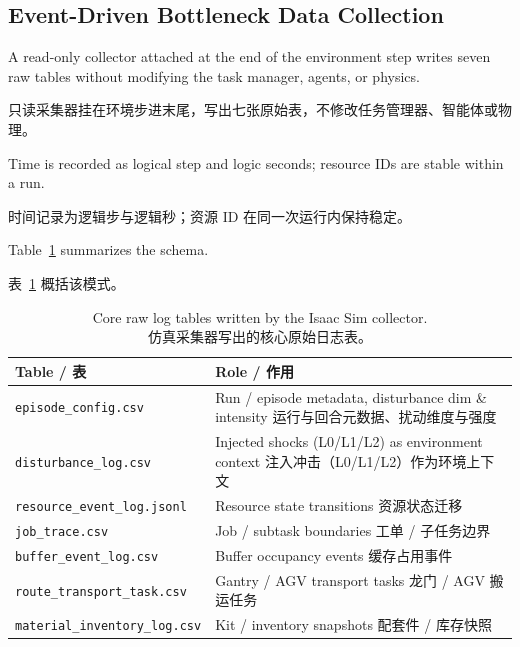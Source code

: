 \documentclass[12pt,a4paper,oneside,scheme=plain]{ctexrep}
\newcommand{\bip}[2]{%
  \par #1\par
  \nobreak\vspace{0.12em}%
  {\small\color{black!62}#2}\par
  \vspace{0.62em}%
}
\begin{document}
\subsection[Event-Driven Bottleneck Data Collection / 事件驱动数据采集]{Event-Driven Bottleneck Data Collection}
\label{sec:collect}

\bip
{A read-only collector attached at the end of the environment step writes seven raw tables without modifying the task manager, agents, or physics.}
{只读采集器挂在环境步进末尾，写出七张原始表，不修改任务管理器、智能体或物理。}

\bip
{Time is recorded as logical step and logic seconds; resource IDs are stable within a run.}
{时间记录为逻辑步与逻辑秒；资源 ID 在同一次运行内保持稳定。}

\bip
{Table~\ref{tab:raw} summarizes the schema.}
{表~\ref{tab:raw} 概括该模式。}

\begin{table}[ht]
\centering
\caption{Core raw log tables written by the Isaac Sim collector.\\
{\small 仿真采集器写出的核心原始日志表。}}
\label{tab:raw}
\begin{tabular}{p{}p{}}
\toprule
Table / 表 & Role / 作用 \\
\midrule
\texttt{episode\_config.csv} &
Run / episode metadata, disturbance dim \& intensity\newline
{\small 运行与回合元数据、扰动维度与强度} \\
\texttt{disturbance\_log.csv} &
Injected shocks (L0/L1/L2) as environment context\newline
{\small 注入冲击（L0/L1/L2）作为环境上下文} \\
\texttt{resource\_event\_log.jsonl} &
Resource state transitions\newline
{\small 资源状态迁移} \\
\texttt{job\_trace.csv} &
Job / subtask boundaries\newline
{\small 工单 / 子任务边界} \\
\texttt{buffer\_event\_log.csv} &
Buffer occupancy events\newline
{\small 缓存占用事件} \\
\texttt{route\_transport\_task.csv} &
Gantry / AGV transport tasks\newline
{\small 龙门 / AGV 搬运任务} \\
\texttt{material\_inventory\_log.csv} &
Kit / inventory snapshots\newline
{\small 配套件 / 库存快照} \\
\bottomrule
\end{tabular}
\end{table}
\end{document}
